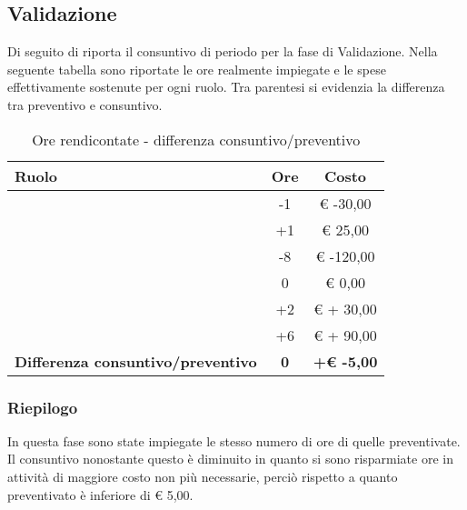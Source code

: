 		\subsection{Validazione} %
		\label{sub:consuntivo_validazione}
			Di seguito di riporta il consuntivo di periodo per la fase di Validazione. \newline
			Nella seguente tabella sono riportate le ore realmente impiegate e le spese effettivamente sostenute per ogni ruolo. Tra parentesi si evidenzia la differenza tra preventivo e consuntivo.
			\begin{table}[!h]
				\begin{center}
					\begin{tabularx}{0.90\textwidth}{|X|c|c|}
						\hline
						\textbf{Ruolo} & \textbf{Ore} & \textbf{Costo} \\
						\hline
						\roleProjectManager & -1 & \euro{} -30,00 \\
						\hline
						\roleAnalyst & +1 &  \euro{} 25,00 \\
						\hline
						\roleDesigner & -8 & \euro{} -120,00 \\
						\hline
						\roleAdministrator & 0  & \euro{} 0,00 \\
						\hline
						\roleProgrammer & +2 & \euro{} + 30,00 \\
						\hline
						\roleVerifier & +6 & \euro{} + 90,00 \\
						\hline
						\textbf{Differenza consuntivo/preventivo} & \textbf{0} & \textbf{+\euro{} -5,00} \\
						\hline
					\end{tabularx}
				\end{center}
			\caption{Ore rendicontate - differenza consuntivo/preventivo}
			\end{table}

			\subsubsection{Riepilogo} %
			In questa fase sono state impiegate le stesso numero di ore di quelle preventivate. \newline
			Il consuntivo nonostante questo è diminuito in quanto si sono risparmiate ore in attività di maggiore costo non più necessarie, perciò rispetto a quanto preventivato è inferiore di \euro{} 5,00.

